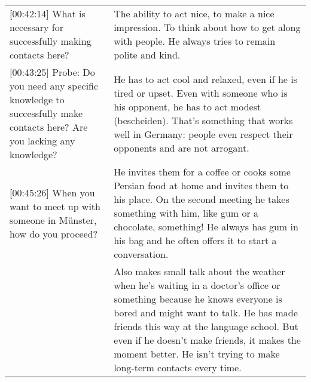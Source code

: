 \begin{longtable}{p{}p{}}
{[}00:42:14{]} What is necessary for successfully making contacts here?                                                                                         & The ability to act nice, to make a nice impression. To think about how to get along with people. He always tries to remain polite and kind.                                                                                                                                                                                                                                                                                                                                                                                                                                                  \\
{[}00:43:25{]} Probe: Do you need any specific knowledge to successfully make contacts here? Are you lacking any knowledge?                                     & He has to act cool and relaxed, even if he is tired or upset. Even with someone who is his opponent, he has to act modest (bescheiden). That's something that works well in Germany: people even respect their opponents and are not arrogant.                                                                                                                                                                                                                                                                                                                                                  \\
{[}00:45:26{]} When you want to meet up with someone in Münster, how do you proceed?                                                                            & He invites them for a coffee or cooks some Persian food at home and invites them to his place. On the second meeting he takes something with him, like gum or a chocolate, something! He always has gum in his bag and he often offers it to start a conversation.                                                                                                                                                                                                                                                                                                                              \\
                                                                                                                                                                & Also makes small talk about the weather when he's waiting in a doctor's office or something because he knows everyone is bored and might want to talk. He has made friends this way at the language school. But even if he doesn't make friends, it makes the moment better. He isn't trying to make long-term contacts every time.                                                                                                                                                                                                                                                               \\

\end{longtable}
